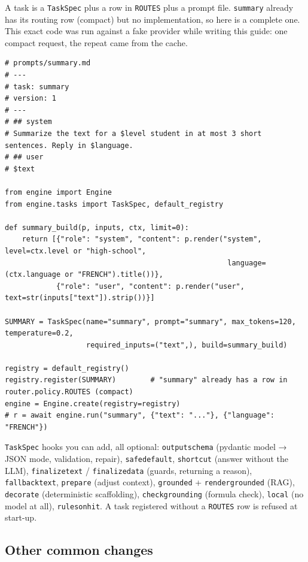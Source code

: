 \documentclass[11pt,a4paper]{article}
\renewcommand{\_}{\origus\allowbreak}
\begin{document}
A task is a \texttt{TaskSpec} plus a row in \texttt{ROUTES} plus a prompt file. \texttt{summary} already has its
routing row (compact) but no implementation, so here is a complete one. This exact code was run
against a fake provider while writing this guide: one compact request, the repeat came from the cache.

\begin{lstlisting}
# prompts/summary.md
# ---
# task: summary
# version: 1
# ---
# ## system
# Summarize the text for a $level student in at most 3 short sentences. Reply in $language.
# ## user
# $text

from engine import Engine
from engine.tasks import TaskSpec, default_registry

def summary_build(p, inputs, ctx, limit=0):
    return [{"role": "system", "content": p.render("system", level=ctx.level or "high-school",
                                                    language=(ctx.language or "FRENCH").title())},
            {"role": "user", "content": p.render("user", text=str(inputs["text"]).strip())}]

SUMMARY = TaskSpec(name="summary", prompt="summary", max_tokens=120, temperature=0.2,
                   required_inputs=("text",), build=summary_build)

registry = default_registry()
registry.register(SUMMARY)        # "summary" already has a row in router.policy.ROUTES (compact)
engine = Engine.create(registry=registry)
# r = await engine.run("summary", {"text": "..."}, {"language": "FRENCH"})
\end{lstlisting}

\texttt{TaskSpec} hooks you can add, all optional: \texttt{output\_schema} (pydantic model → JSON mode,
validation, repair), \texttt{safe\_default}, \texttt{shortcut} (answer without the LLM), \texttt{finalize\_text} /
\texttt{finalize\_data} (guards, returning a reason), \texttt{fallback\_text}, \texttt{prepare} (adjust context),
\texttt{grounded} + \texttt{render\_grounded} (RAG), \texttt{decorate} (deterministic scaffolding),
\texttt{check\_grounding} (formula check), \texttt{local} (no model at all), \texttt{rules\_on\_hit}.
A task registered without a \texttt{ROUTES} row is refused at start-up.

\subsection{Other common changes}
\end{document}
